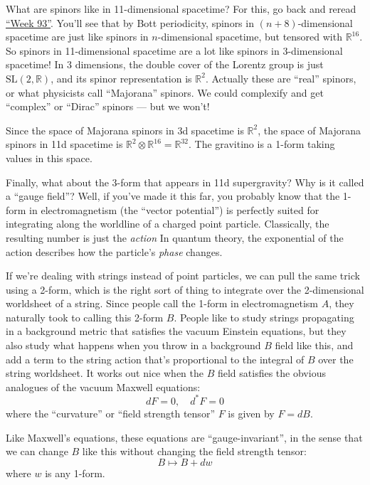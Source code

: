 \documentclass{article}
\begin{document}
What are spinors like in 11-dimensional spacetime? For this, go back and
reread \protect\hyperlink{week93}{``Week 93''}. You'll see that by Bott
periodicity, spinors in \((n+8)\)-dimensional spacetime are just like
spinors in \(n\)-dimensional spacetime, but tensored with
\(\mathbb{R}^{16}\). So spinors in 11-dimensional spacetime are a lot
like spinors in 3-dimensional spacetime! In 3 dimensions, the double
cover of the Lorentz group is just \(\mathrm{SL}(2,\mathbb{R})\), and
its spinor representation is \(\mathbb{R}^2\). Actually these are
``real'' spinors, or what physicists call ``Majorana'' spinors. We could
complexify and get ``complex'' or ``Dirac'' spinors --- but we won't!

Since the space of Majorana spinors in 3d spacetime is \(\mathbb{R}^2\),
the space of Majorana spinors in 11d spacetime is
\(\mathbb{R}^2 \otimes \mathbb{R}^{16} = \mathbb{R}^{32}\). The
gravitino is a 1-form taking values in this space.

Finally, what about the 3-form that appears in 11d supergravity? Why is
it called a ``gauge field''? Well, if you've made it this far, you
probably know that the 1-form in electromagnetism (the ``vector
potential'') is perfectly suited for integrating along the worldline of
a charged point particle. Classically, the resulting number is just the
\emph{action} In quantum theory, the exponential of the action describes
how the particle's \emph{phase} changes.

If we're dealing with strings instead of point particles, we can pull
the same trick using a 2-form, which is the right sort of thing to
integrate over the 2-dimensional worldsheet of a string. Since people
call the 1-form in electromagnetism \(A\), they naturally took to
calling this 2-form \(B\). People like to study strings propagating in a
background metric that satisfies the vacuum Einstein equations, but they
also study what happens when you throw in a background \(B\) field like
this, and add a term to the string action that's proportional to the
integral of \(B\) over the string worldsheet. It works out nice when the
\(B\) field satisfies the obvious analogues of the vacuum Maxwell
equations: \[dF = 0,\quad d^*F = 0\] where the ``curvature'' or ``field
strength tensor'' \(F\) is given by \(F=dB\).

Like Maxwell's equations, these equations are ``gauge-invariant'', in
the sense that we can change \(B\) like this without changing the field
strength tensor: \[B \mapsto B + dw\] where \(w\) is any 1-form.
\end{document}
